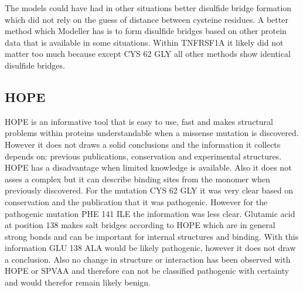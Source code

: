 The models could have had in other situations better disulfide bridge formation which did not rely on the guess of distance between cysteine residues. A better method which Modeller has is to form disulfide bridges based on other protein data that is available in some situations. Within TNFRSF1A it likely did not matter too much because except CYS 62 GLY all other methods show identical disulfide bridges. 

\subsection{HOPE}
HOPE is an informative tool that is easy to use, fast and makes structural problems within proteins understandable when a missense mutation is discovered. However it does not draws a solid conclusions and the information it collects depends on: previous publications, conservation and experimental structures. HOPE has a disadvantage when limited knowledge is available. Also it does not asses a complex but it can describe binding sites from the monomer when previously discovered. For the mutation CYS 62 GLY it was very clear based on conservation and the publication that it was pathogenic. However for the pathogenic mutation PHE 141 ILE the information was less clear. Glutamic acid at position 138 makes salt bridges according to HOPE which are in general strong bonds and can be important for internal structures and binding. With this information GLU 138 ALA would be likely pathogenic, however it does not draw a conclusion. Also no change in structure or interaction has been observed with HOPE or SPVAA and therefore can not be classified pathogenic with certainty and would therefor remain likely benign.
